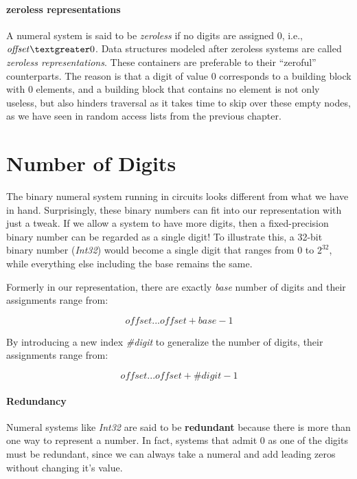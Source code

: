\documentclass[\main/thesis.tex]{subfiles}
\begin{document}
\paragraph{zeroless representations}
A numeral system is said to be \textit{zeroless} if no digits are assigned $ 0 $,
i.e., $ \mathit{offset} \textgreater 0 $.
Data structures modeled after zeroless systems are called \textit{zeroless representations}.
These containers are preferable to their ``zeroful'' counterparts.
The reason is that a digit of value $ 0 $ corresponds to a building block with
$ 0 $ elements, and a building block that contains no element is not only useless,
but also hinders traversal as it takes time to skip over these empty nodes,
as we have seen in random access lists from the previous chapter.

\section{Number of Digits}

The binary numeral system running in circuits looks different from what we have
in hand.
Surprisingly, these binary numbers can fit into our representation with just a tweak.
If we allow a system to have more digits,
then a fixed-precision binary number can be regarded as a single digit!
To illustrate this,
a 32-bit binary number (\textit{Int32}) would become a single digit that ranges
from $ 0 $ to $ 2^{32} $, while everything else including the base remains the same.

Formerly in our representation,
there are exactly \textit{base} number of digits and their assignments range from:

$$
    \mathit{offset}  ...  \mathit{offset} + \mathit{base} - 1
$$

By introducing a new index \textit{\#digit} to generalize the number of digits,
their assignments range from:

$$
    \mathit{offset}  ...  \mathit{offset} + \mathit{\#digit} - 1
$$

\paragraph{Redundancy}

Numeral systems like \textit{Int32} are said to be \textbf{redundant}
because there is more than one way to represent a number.
In fact, systems that admit $ 0 $ as one of the digits must be redundant,
since we can always take a numeral and add leading zeros without changing it's value.
\end{document}
